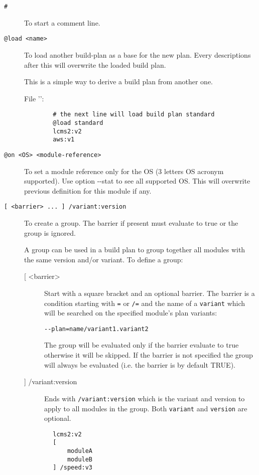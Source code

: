 \documentclass[a4paper,12pt,twoside]{article}
\newcommand{\code}[1]{\texttt{#1}}
\newcommand{\file}[1]{'{\path{#1}}'}
\newcommand{\ddash}{-{}-}
\begin{document}
\begin{description}
	\item[\code{\#}] To start a comment line.

	\item[\code{@load <name>}] To load another build-plan as a base for the new plan. Every descriptions after this will overwrite the loaded build plan.

	This is a simple way to derive a build plan from another one.

	File \file{.plan-next}:

	\begin{lstlisting}
		# the next line will load build plan standard
		@load standard
		lcms2:v2
		aws:v1
	\end{lstlisting}

	\item[\code{@on <OS> <module-reference>}] To set a module reference only for the OS (3 letters OS acronym supported). Use option \ddash{}stat to see all supported OS. This will overwrite previous definition for this module if any.

	\item[\code{[ <barrier> ... ] /variant:version}] To create a group. The barrier if present must evaluate to true or the group is ignored.

	A group can be used in a build plan to group together all modules with the same version and/or variant. To define a group:

	\begin{description}
		\item[ {[} <barrier>] Start with a square bracket and an optional barrier. The barrier is a condition starting with \code{=} or \code{/=} and the name of a \code{variant} which will be searched on the specified module's plan variants:

		\code{\ddash{}plan=name/variant1.variant2}

		The group will be evaluated only if the barrier evaluate to true otherwise it will be skipped. If the barrier is not specified the group will always be evaluated (i.e. the barrier is by default TRUE).

		\item[ {]} /variant:version ] Ends with \code{/variant:version} which is the variant and version to apply to all modules in the group. Both \code{variant} and \code{version} are optional.
	\end{description}

	\begin{lstlisting}
		lcms2:v2
		[
			moduleA
			moduleB
		] /speed:v3
	\end{lstlisting}
\end{description}
\end{document}
